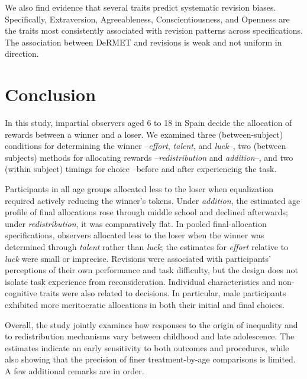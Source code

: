 \documentclass[11pt]{article}
\begin{document}
We also find evidence that several traits predict systematic revision biases. Specifically, Extraversion, Agreeableness, Conscientiousness, and Openness are the traits most consistently associated with revision patterns across specifications. The association between DeRMET and revisions is weak and not uniform in direction.



\section{Conclusion} \label{sec-conclusion}

In this study, impartial observers aged 6 to 18 in Spain decide the allocation of rewards between a winner and a loser. We examined three (between-subject) conditions for determining the winner --\emph{effort}, \emph{talent}, and \emph{luck}--, two (between subjects)  methods for allocating rewards --\emph{redistribution\/}  and \emph{addition}--, and two (within subject) timings for choice --before and after experiencing the task. 

Participants in all age groups allocated less to the loser when equalization required actively reducing the winner's tokens. Under \emph{addition}, the estimated age profile of final allocations rose through middle school and declined afterwards; under \emph{redistribution}, it was comparatively flat. In pooled final-allocation specifications, observers allocated less to the loser when the winner was determined through \emph{talent} rather than \emph{luck}; the estimates for \emph{effort} relative to \emph{luck} were small or imprecise. Revisions were associated with participants' perceptions of their own performance and task difficulty, but the design does not isolate task experience from reconsideration. Individual characteristics and non-cognitive traits were also related to decisions. In particular, male participants exhibited more meritocratic allocations in both their initial and final choices.

Overall, the study jointly examines how responses to the origin of inequality and to redistribution mechanisms vary between childhood and late adolescence. The estimates indicate an early sensitivity to both outcomes and procedures, while also showing that the precision of finer treatment-by-age comparisons is limited. A few additional remarks are in order.

 
\end{document}
